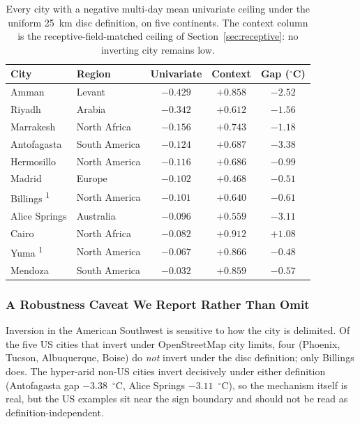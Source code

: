 \documentclass[remotesensing,article,submit,oneauthor]{Definitions/mdpi}
\begin{document}
\begin{table}[H]
\caption{Every city with a negative multi-day mean univariate ceiling
under the uniform 25~km disc definition, on five continents. The context
column is the receptive-field-matched ceiling of
Section~\ref{sec:receptive}: no inverting city remains
low.\label{tab:arid}}
\begin{tabularx}{\textwidth}{llCCC}
\toprule
\textbf{City} & \textbf{Region} & \textbf{Univariate} &
\textbf{Context} & \textbf{Gap (}{\boldmath$^{\circ}$}\textbf{C)} \\
\midrule
Amman & Levant & $-0.429$ & $+0.858$ & $-2.52$ \\
Riyadh & Arabia & $-0.342$ & $+0.612$ & $-1.56$ \\
Marrakesh & North Africa & $-0.156$ & $+0.743$ & $-1.18$ \\
Antofagasta & South America & $-0.124$ & $+0.687$ & $-3.38$ \\
Hermosillo & North America & $-0.116$ & $+0.686$ & $-0.99$ \\
Madrid & Europe & $-0.102$ & $+0.468$ & $-0.51$ \\
Billings \textsuperscript{1} & North America & $-0.101$ & $+0.640$ & $-0.61$ \\
Alice Springs & Australia & $-0.096$ & $+0.559$ & $-3.11$ \\
Cairo & North Africa & $-0.082$ & $+0.912$ & $+1.08$ \\
Yuma \textsuperscript{1} & North America & $-0.067$ & $+0.866$ & $-0.48$ \\
Mendoza & South America & $-0.032$ & $+0.859$ & $-0.57$ \\
\bottomrule
\end{tabularx}

\end{table}

\subsubsection{A Robustness Caveat We Report Rather Than Omit}

Inversion in the American Southwest is sensitive to how the city is
delimited. Of the five US cities that invert under OpenStreetMap city
limits, four (Phoenix, Tucson, Albuquerque, Boise) do \emph{not} invert
under the disc definition; only Billings does. The hyper-arid non-US
cities invert decisively under either definition (Antofagasta gap
$-3.38$~$^{\circ}$C, Alice Springs $-3.11$~$^{\circ}$C), so the mechanism
itself is real, but the US examples sit near the sign boundary and should
not be read as definition-independent.
\end{document}
